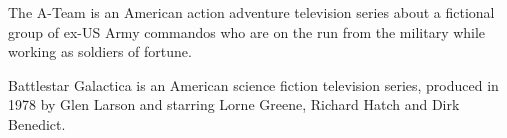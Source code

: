 The A-Team is an American action adventure television series about a fictional group of ex-US Army commandos who are on the run from the military while working as soldiers of fortune.

Battlestar Galactica is an American science fiction television series, produced in 1978 by Glen Larson and starring Lorne Greene, Richard Hatch and Dirk Benedict.
